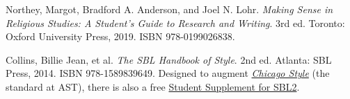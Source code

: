 \documentclass[titlepage]{article}
\begin{document}
\begingroup
\renewcommand{\section}[2]{}%
\begin{thebibliography}{Making Sense}%

	 Northey, Margot, Bradford A. Anderson, and Joel N. Lohr.
	\emph{Making Sense in Religious Studies: A Student's Guide to Research and Writing}.
	3rd ed. Toronto: Oxford University Press, 2019. ISBN 978-0199026838.

	 Collins, Billie Jean, et al.
	\emph{The SBL Handbook of Style}.
	2nd ed. Atlanta: SBL Press, 2014. ISBN 978-1589839649.
	Designed to augment \href{http://www.chicagomanualofstyle.org/home.html}{\emph{Chicago Style}}
	(the standard at AST), there is also a free
	\href{https://www.sbl-site.org/assets/pdfs/pubs/SBLHSsupp2015-02.pdf}{Student Supplement for SBL2}.

\end{thebibliography}
\endgroup
\end{document}
